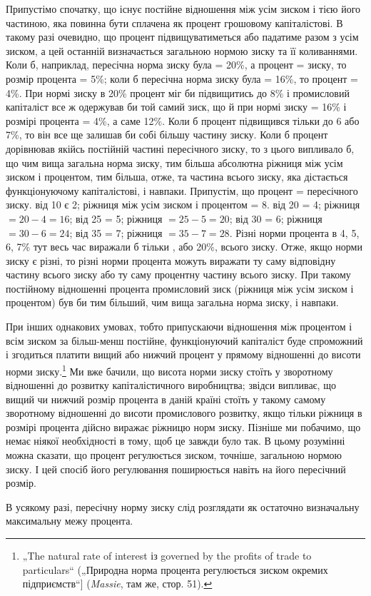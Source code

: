 
Припустімо спочатку, що існує постійне відношення між усім
зиском і тією його частиною, яка повинна бути сплачена як процент
грошовому капіталістові. В такому разі очевидно, що процент
підвищуватиметься або падатиме разом з усім зиском, а цей
останній визначається загальною нормою зиску та її коливаннями.
Коли б, наприклад, пересічна норма зиску була = 20\%, а процент
=  зиску, то розмір процента = 5\%; коли б пересічна
норма зиску була = 16\%, то процент = 4\%. При нормі зиску в
20\% процент міг би підвищитись до 8\% і промисловий капіталіст
все ж одержував би той самий зиск, що й при нормі зиску
= 16\% і розмірі процента = 4\%, а саме 12\%. Коли б процент
підвищився тільки до 6 або 7\%, то він все ще залишав би собі
більшу частину зиску. Коли б процент дорівнював якійсь постійній
частині пересічного зиску, то з цього випливало б, що
чим вища загальна норма зиску, тим більша абсолютна ріжниця
між усім зиском і процентом, тим більша, отже, та частина
всього зиску, яка дістається функціонуючому капіталістові, і навпаки.
Припустім, що процент =  пересічного зиску.  від 10
є 2; ріжниця між усім зиском і процентом = 8.  від 20 = 4;
ріжниця $= 20 - 4 = 16$;  від 25 = 5; ріжниця $= 25 - 5 = 20$;  від
30 = 6; ріжниця $= 30 - 6 = 24$;  від 35 = 7; ріжниця $= 35 - 7 = 28$.
Різні норми процента в 4, 5, 6, 7\% тут весь час виражали б
тільки , або 20\%, всього зиску. Отже, якщо норми зиску є різні,
то різні норми процента можуть виражати ту саму відповідну
частину всього зиску або ту саму процентну частину всього
зиску. При такому постійному відношенні процента промисловий
зиск (ріжниця між усім зиском і процентом) був би тим більший,
чим вища загальна норма зиску, і навпаки.

При інших однакових умовах, тобто припускаючи відношення
між процентом і всім зиском за більш-менш постійне, функціонуючий
капіталіст буде спроможний і згодиться платити вищий
або нижчий процент у прямому відношенні до висоти норми
зиску.\footnote{
„The natural rate of interest із governed by the profits of trade to particulars“
(„Природна норма процента регулюється зиском окремих підприємств“]
(\emph{Massie}, там же, стор. 51).
} Ми вже бачили, що висота норми зиску стоїть у зворотному
відношенні до розвитку капіталістичного виробництва;
звідси випливає, що вищий чи нижчий розмір процента в даній
країні стоїть у такому самому зворотному відношенні до висоти
промислового розвитку, якщо тільки ріжниця в розмірі
процента дійсно виражає ріжницю норм зиску. Пізніше ми побачимо,
що немає ніякої необхідності в тому, щоб це завжди
було так. В цьому розумінні можна сказати, що процент регулюється
зиском, точніше, загальною нормою зиску. І цей спосіб
його регулювання поширюється навіть на його пересічний розмір.

В усякому разі, пересічну норму зиску слід розглядати як
остаточно визначальну максимальну межу процента.
